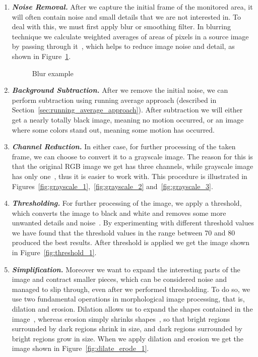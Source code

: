 \begin{enumerate}
\item \textit{\textbf{Noise Removal.}} After we capture the initial frame of the monitored area, it will often contain noise and small details that we are not interested in. To deal with this, we must first apply blur or smoothing filter. In blurring technique we calculate weighted averages of areas of pixels in a source image by passing through it~\cite{blur_1}, which helps to reduce image noise and detail, as shown in Figure~\ref{fig:blur_example}.
\begin{figure}[ht]
	\centering
	\quad
	\caption{Blur example}
	\label{fig:blur_example}
\end{figure}

\item \textit{\textbf{Background Subtraction.}} After we remove the initial noise, we can perform subtraction using running average approach (described in Section~\ref{sec:running_average_approach}). After subtraction we will either get a nearly totally black image, meaning no motion occurred, or an image where some colors stand out, meaning some motion has occurred. 

\item \textit{\textbf{Channel Reduction.}} In either case, for further processing of the taken frame, we can choose to convert it to a grayscale image. The reason for this is that the original RGB image we get has three channels, while grayscale image has only one~\cite{grayscale_1}, thus it is easier to work with. This procedure is illustrated in Figures~\ref{fig:grayscale_1},~\ref{fig:grayscale_2} and~\ref{fig:grayscale_3}. 

\item \textit{\textbf{Thresholding.}} For further processing of the image, we apply a threshold, which converts the image to black and white and removes some more unwanted details and noise~\cite{threshold_1}. By experimenting with different threshold values we have found that the threshold values in the range between 70 and 80 produced the best results. After threshold is applied we get the image shown in Figure~\ref{fig:threshold_1}. 

\item \textit{\textbf{Simplification.}} Moreover we want to expand the interesting parts of the image and contract smaller pieces, which can be considered noise and managed to slip through, even after we performed thresholding. To do so, we use two fundamental operations in morphological image processing, that is, dilation and erosion. Dilation allows us to expand the shapes contained in the image~\cite{dilation_1}, whereas erosion simply shrinks shapes~\cite{erosion_1}, so that bright regions surrounded by dark regions shrink in size, and dark regions surrounded by bright regions grow in size. When we apply dilation and erosion we get the image shown in Figure~\ref{fig:dilate_erode_1}. 


\end{enumerate}
